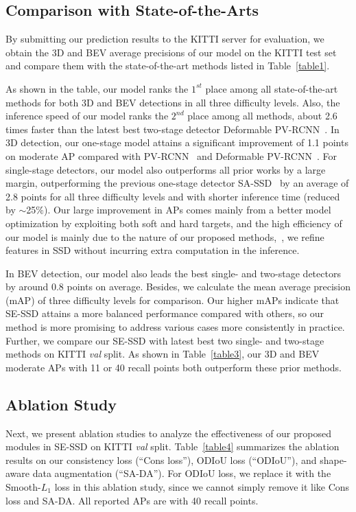 \documentclass[letterpaper]{article}
\begin{document}
\subsection{Comparison with State-of-the-Arts}
By submitting our prediction results to the KITTI server for evaluation, we obtain the 3D and BEV average precisions of our model on the KITTI test set and compare them with the state-of-the-art methods listed in Table~\ref{table1}.

As shown in the table, our model ranks the $1^{st}$ place among all state-of-the-art methods for both 3D and BEV detections in all three difficulty levels.
Also, the inference speed of our model ranks the $2^{nd}$ place among all methods, about 2.6 times faster than the latest best two-stage detector Deformable PV-RCNN~\cite{2020deformable}.
In 3D detection, our one-stage model attains a significant improvement of 1.1 points on moderate AP compared with PV-RCNN~\cite{2020deformable} and Deformable PV-RCNN~\cite{shi2020pv}.
For single-stage detectors, our model also outperforms all prior works by a large margin, outperforming the previous one-stage detector SA-SSD~\cite{he2020structure} by an average of 2.8 points for all three difficulty levels and with shorter inference time (reduced by $\sim$25$\%$).
Our large improvement in APs comes mainly from a better model optimization by exploiting both soft and hard targets, and the high efficiency of our model is mainly due to the nature of our proposed methods,~\ie, we refine features in SSD without incurring extra computation in the inference.

In BEV detection, our model also leads the best single- and two-stage detectors by around 0.8 points on average.
Besides, we calculate the mean average precision (mAP) of three difficulty levels for comparison.
Our higher mAPs indicate that SE-SSD attains a more balanced performance compared with others, so our method is more promising to address various cases more consistently in practice.
Further, we compare our SE-SSD with latest best two single- and two-stage methods on KITTI \textit{val} split.
As shown in Table~\ref{table3}, our 3D and BEV moderate APs with 11 or 40 recall points both outperform these prior methods.




\subsection{Ablation Study}
Next, we present ablation studies to analyze the effectiveness of our proposed modules in SE-SSD on KITTI \textit{val} split.
Table~\ref{table4} summarizes the ablation results on our consistency loss (``Cons loss''), ODIoU loss (``ODIoU''), and shape-aware data augmentation (``SA-DA'').
For ODIoU loss, we replace it with the Smooth-$L_1$ loss in this ablation study, since we cannot simply remove it like Cons loss and SA-DA.
All reported APs are with 40 recall points.
\end{document}
